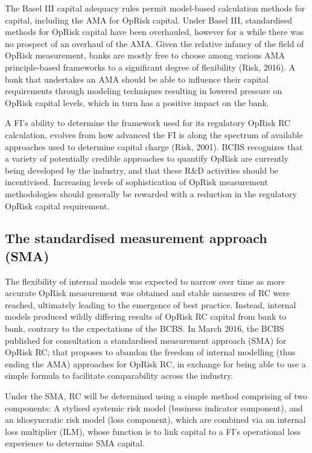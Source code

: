 \documentclass{DissertateUSU}
\begin{document}
The Basel III capital adequacy rules permit model-based calculation
methods for capital, including the AMA for OpRisk capital. Under Basel
III, standardised methods for OpRisk capital have been overhauled,
however for a while there was no prospect of an overhaul of the AMA.
Given the relative infancy of the field of OpRisk measurement, banks are
mostly free to choose among various AMA principle-based frameworks to a
significant degree of flexibility (Risk, 2016). A bank that undertakes
an AMA should be able to influence their capital requirements through
modeling techniques resulting in lowered pressure on OpRisk capital
levels, which in turn has a positive impact on the bank.\medskip

A FI's ability to determine the framework used for its regulatory OpRisk
RC calculation, evolves from how advanced the FI is along the spectrum
of available approaches used to determine capital charge (Risk, 2001).
BCBS recognizes that a variety of potentially credible approaches to
quantify OpRisk are currently being developed by the industry, and that
these R\&D activities should be incentivised. Increasing levels of
sophistication of OpRisk measurement methodologies should generally be
rewarded with a reduction in the regulatory OpRisk capital requirement.

\subsection{The standardised measurement approach (SMA)}

The flexibility of internal models was expected to narrow over time as
more accurate OpRisk measurement was obtained and stable measures of RC
were reached, ultimately leading to the emergence of best practice.
Instead, internal models produced wildly differing results of OpRisk RC
capital from bank to bank, contrary to the expectations of the BCBS. In
March 2016, the BCBS published for consultation a standardised
measurement approach (SMA) for OpRisk RC; that proposes to abandon the
freedom of internal modelling (thus ending the AMA) approaches for
OpRisk RC, in exchange for being able to use a simple formula to
facilitate comparability across the industry.\medskip

Under the SMA, RC will be determined using a simple method comprising of
two components: A stylised systemic risk model (business indicator
component), and an idiosyncratic risk model (loss component), which are
combined via an internal loss multiplier (ILM), whose function is to
link capital to a FI's operational loss experience to determine SMA
capital.\medskip
\end{document}
